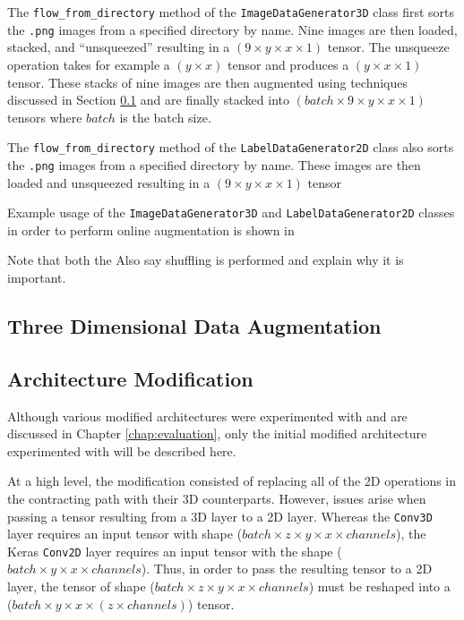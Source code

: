 The \texttt{flow\_from\_directory} method of the \texttt{ImageDataGenerator3D} class first sorts the \texttt{.png} images from a specified directory by name. Nine images are then loaded, stacked, and ``unsqueezed'' resulting in a $(9 \times y \times x \times 1)$ tensor. The unsqueeze operation takes for example a $(y \times x)$ tensor and produces a $(y \times x \times 1)$ tensor. These stacks of nine images are then augmented using techniques discussed in Section \ref{sec:3daug} and are finally stacked into $(batch \times 9 \times y \times x \times 1)$ tensors where $batch$ is the batch size.

The \texttt{flow\_from\_directory} method of the \texttt{LabelDataGenerator2D} class also sorts the \texttt{.png} images from a specified directory by name. These images are then loaded and unsqueezed resulting in a $(9 \times y \times x \times 1)$ tensor

Example usage of the \texttt{ImageDataGenerator3D} and \texttt{LabelDataGenerator2D} classes in order to perform online augmentation is shown in %

Note that both the 
Also say shuffling is performed and explain why it is important.

\subsection{Three Dimensional Data Augmentation}
\label{sec:3daug}

\subsection{Architecture Modification}

Although various modified architectures were experimented with and are discussed in Chapter \ref{chap:evaluation}, only the initial modified architecture experimented with will be described here.

At a high level, the modification consisted of replacing all of the 2D operations in the contracting path with their 3D counterparts. However, issues arise when passing a tensor resulting from a 3D layer to a 2D layer. Whereas the \texttt{Conv3D} layer requires an input tensor with shape ($batch \times z \times y \times x \times channels$), the Keras \texttt{Conv2D} layer requires an input tensor with the shape ($batch \times y \times x \times channels$). Thus, in order to pass the resulting tensor to a 2D layer, the tensor of shape ($batch \times z \times y \times x \times channels$) must be reshaped into a ($batch \times y \times x \times (z \times channels)$) tensor.

